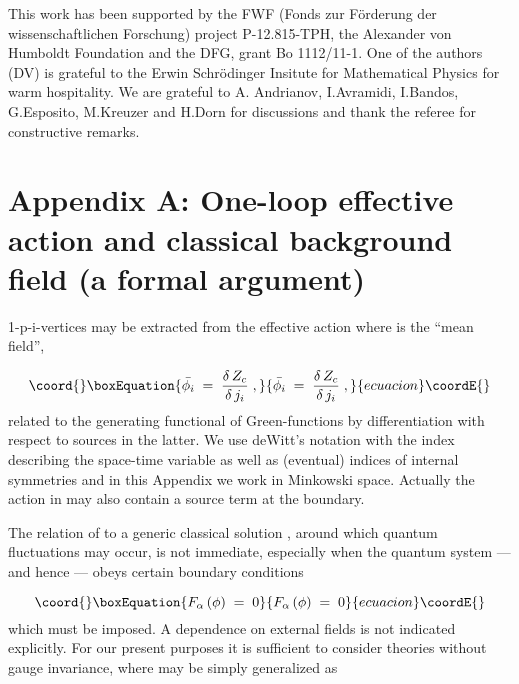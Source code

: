 \documentclass[a4paper,12pt]{article}
\def\ul{\underline}
\begin{document}
This work has been supported by the FWF (Fonds
zur F\"{o}rderung der wissenschaftlichen Forschung) 
project P-12.815-TPH,
the Alexander von Humboldt Foundation and the DFG, grant Bo 1112/11-1.
One of the authors (DV) is grateful to the Erwin Schr\"{o}dinger
Insitute for Mathematical Physics for warm hospitality.
We are grateful to  A. Andrianov,
I.Avramidi, I.Bandos, G.Esposito, M.Kreuzer and H.Dorn
for discussions and thank the referee for constructive remarks. 




\section*{Appendix A:
One-loop effective action and classical background field
(a formal argument)}

1-p-i-vertices 
may be extracted from the effective action \coordHE{} where \myHighlight{$\bar\phi$}\coordHE{} is the ``mean field'', 

\begin{equation}\coord{}\boxEquation{
\bar{\phi_i} \; = \; \frac{\delta\,Z_c}{\delta\, j_i}\; ,
\label{w1} 
}{
\bar{\phi_i} \; = \; \frac{\delta\,Z_c}{\delta\, j_i}\; ,
}{ecuacion}\coordE{}\end{equation}
related to the generating functional \coordHE{} of 
Green-functions \coordHE{} by differentiation with 
respect to sources \coordHE{} in the latter. We use deWitt's 
notation with the index \coordHE{} describing the space-time 
variable as well as (eventual) indices of internal 
symmetries and in this Appendix we work in Minkowski space. 
Actually the action \coordHE{} in \coordHE{} may also contain a source term at the boundary. 

The relation of \coordHE{} to a generic classical 
solution \myHighlight{$\ul{\phi}_i$}\coordHE{}, around which quantum fluctuations 
\coordHE{} may 
occur, is not immediate, especially when the quantum system ---  and hence 
\myHighlight{$\ul{\phi}_i$}\coordHE{} --- obeys certain  boundary conditions

\begin{equation}\coord{}\boxEquation{
F_{\alpha}\,(\phi)\; = \; 0 \label{w2}
}{
F_{\alpha}\,(\phi)\; = \; 0 }{ecuacion}\coordE{}\end{equation}
which must be imposed. 
A dependence on external fields is not indicated 
explicitly. 
For our present purposes it is sufficient to consider 
theories without gauge invariance, where \coordHE{} may be 
simply generalized as
\end{document}
